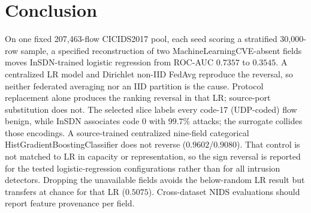 \documentclass[conference,a4paper]{IEEEtran}
\begin{document}
\section{Conclusion}
On one fixed 207,463-flow CICIDS2017 pool, each seed scoring a stratified 30,000-row sample, a specified reconstruction of two MachineLearningCVE-absent fields moves InSDN-trained logistic regression from ROC-AUC $0.7357$ to $0.3545$. A centralized LR model and Dirichlet non-IID FedAvg reproduce the reversal, so neither federated averaging nor an IID partition is the cause. Protocol replacement alone produces the ranking reversal in that LR; source-port substitution does not. The selected slice labels every code-17 (UDP-coded) flow benign, while InSDN associates code 0 with $99.7\%$ attacks; the surrogate collides those encodings. A source-trained centralized nine-field categorical HistGradientBoostingClassifier does not reverse ($0.9602$/$0.9080$). That control is not matched to LR in capacity or representation, so the sign reversal is reported for the tested logistic-regression configurations rather than for all intrusion detectors. Dropping the unavailable fields avoids the below-random LR result but transfers at chance for that LR ($0.5075$). Cross-dataset NIDS evaluations should report feature provenance per field.
\end{document}
